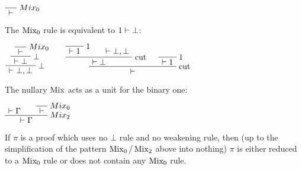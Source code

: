 \(\LabelRule{Mix_0}
\NulRule{\vdash}
\DisplayProof\)

The \(\operatorname{Mix_0}\) rule is equivalent to \(1\vdash\bot\):

\(\LabelRule{Mix_0}
\NulRule{\vdash}
\LabelRule{\bot}
\UnaRule{\vdash\bot}
\LabelRule{\bot}
\UnaRule{\vdash\bot,\bot}
\DisplayProof
\qquad
\LabelRule{\one}
\NulRule{\vdash\one}
\AxRule{\vdash\bot,\bot}
\LabelRule{\rulename{cut}}
\BinRule{\vdash\bot}
\LabelRule{\one}
\NulRule{\vdash\one}
\LabelRule{\rulename{cut}}
\BinRule{\vdash}
\DisplayProof\)

The nullary \(\operatorname{Mix}\) acts as a unit for the binary one:

\(\AxRule{\vdash\Gamma}
\LabelRule{Mix_0}
\NulRule{\vdash}
\LabelRule{Mix_2}
\BinRule{\vdash\Gamma}
\DisplayProof\)

If \(\pi\) is a proof which uses no \(\bot\) rule and no weakening rule,
then (up to the simplification of the pattern
\(\operatorname{Mix_0}/\operatorname{Mix_2}\) above into nothing) \(\pi\) is
either reduced to a \(\operatorname{Mix_0}\) rule or does not contain any
\(\operatorname{Mix_0}\) rule.

